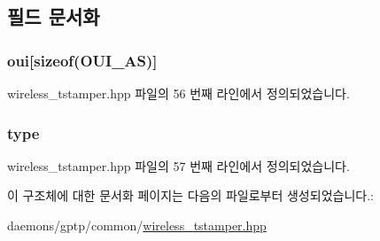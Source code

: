 \subsection{필드 문서화}
\subsubsection[{\texorpdfstring{oui}{oui}}]{ oui\mbox{[}sizeof({\bf O\+U\+I\+\_\+AS})\mbox{]}}\hypertarget{struct_fw_up_label__t_aa08bc131fa0b9ae9116d216683615790}{}\label{struct_fw_up_label__t_aa08bc131fa0b9ae9116d216683615790}


wireless\+\_\+tstamper.\+hpp 파일의 56 번째 라인에서 정의되었습니다.

\subsubsection[{\texorpdfstring{type}{type}}]{ type}\hypertarget{struct_fw_up_label__t_a1d127017fb298b889f4ba24752d08b8e}{}\label{struct_fw_up_label__t_a1d127017fb298b889f4ba24752d08b8e}


wireless\+\_\+tstamper.\+hpp 파일의 57 번째 라인에서 정의되었습니다.



이 구조체에 대한 문서화 페이지는 다음의 파일로부터 생성되었습니다.\+:\begin{DoxyCompactItemize}
\item 
daemons/gptp/common/\hyperlink{wireless__tstamper_8hpp}{wireless\+\_\+tstamper.\+hpp}\end{DoxyCompactItemize}
